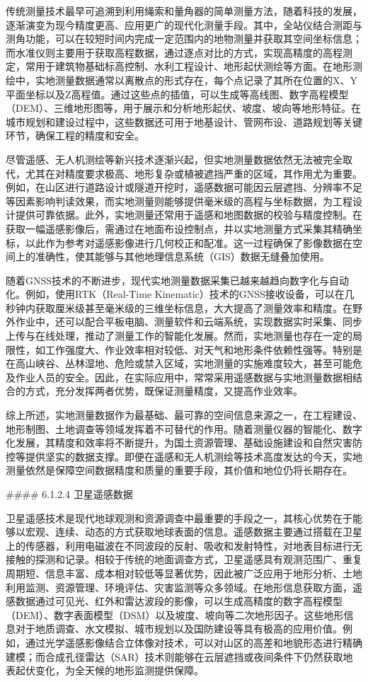 传统测量技术最早可追溯到利用绳索和量角器的简单测量方法，随着科技的发展，逐渐演变为现今精度更高、应用更广的现代化测量手段。其中，全站仪结合测距与测角功能，可以在较短时间内完成一定范围内的地物测量并获取其空间坐标信息；而水准仪则主要用于获取高程数据，通过逐点对比的方式，实现高精度的高程测定，常用于建筑物基础标高控制、水利工程设计、地形起伏测绘等方面。在地形测绘中，实地测量数据通常以离散点的形式存在，每个点记录了其所在位置的X、Y平面坐标以及Z高程值。通过这些点的插值，可以生成等高线图、数字高程模型（DEM）、三维地形图等，用于展示和分析地形起伏、坡度、坡向等地形特征。在城市规划和建设过程中，这些数据还可用于地基设计、管网布设、道路规划等关键环节，确保工程的精度和安全。

尽管遥感、无人机测绘等新兴技术逐渐兴起，但实地测量数据依然无法被完全取代，尤其在对精度要求极高、地形复杂或植被遮挡严重的区域，其作用尤为重要。例如，在山区进行道路设计或隧道开挖时，遥感数据可能因云层遮挡、分辨率不足等因素影响判读效果，而实地测量则能够提供毫米级的高程与坐标数据，为工程设计提供可靠依据。此外，实地测量还常用于遥感和地图数据的校验与精度控制。在获取一幅遥感影像后，需通过在地面布设控制点，并以实地测量方式采集其精确坐标，以此作为参考对遥感影像进行几何校正和配准。这一过程确保了影像数据在空间上的准确性，使其能够与其他地理信息系统（GIS）数据无缝叠加使用。

随着GNSS技术的不断进步，现代实地测量数据采集已越来越趋向数字化与自动化。例如，使用RTK（Real-Time Kinematic）技术的GNSS接收设备，可以在几秒钟内获取厘米级甚至毫米级的三维坐标信息，大大提高了测量效率和精度。在野外作业中，还可以配合平板电脑、测量软件和云端系统，实现数据实时采集、同步上传与在线处理，推动了测量工作的智能化发展。然而，实地测量也存在一定的局限性，如工作强度大、作业效率相对较低、对天气和地形条件依赖性强等。特别是在高山峡谷、丛林湿地、危险或禁入区域，实地测量的实施难度较大，甚至可能危及作业人员的安全。因此，在实际应用中，常常采用遥感数据与实地测量数据相结合的方式，充分发挥两者优势，既保证测量精度，又提高作业效率。

综上所述，实地测量数据作为最基础、最可靠的空间信息来源之一，在工程建设、地形制图、土地调查等领域发挥着不可替代的作用。随着测量仪器的智能化、数字化发展，其精度和效率将不断提升，为国土资源管理、基础设施建设和自然灾害防控等提供坚实的数据支撑。即便在遥感和无人机测绘等技术高度发达的今天，实地测量依然是保障空间数据精度和质量的重要手段，其价值和地位仍将长期存在。

\#\#\#\# 6.1.2.4 卫星遥感数据

卫星遥感技术是现代地球观测和资源调查中最重要的手段之一，其核心优势在于能够以宏观、连续、动态的方式获取地球表面的信息。遥感数据主要通过搭载在卫星上的传感器，利用电磁波在不同波段的反射、吸收和发射特性，对地表目标进行无接触的探测和记录。相较于传统的地面调查方式，卫星遥感具有观测范围广、重复周期短、信息丰富、成本相对较低等显著优势，因此被广泛应用于地形分析、土地利用监测、资源管理、环境评估、灾害监测等众多领域。在地形信息获取方面，遥感数据通过可见光、红外和雷达波段的影像，可以生成高精度的数字高程模型（DEM）、数字表面模型（DSM）以及坡度、坡向等二次地形因子。这些地形信息对于地质调查、水文模拟、城市规划以及国防建设等具有极高的应用价值。例如，通过光学遥感影像结合立体像对技术，可以对山区的高差和地貌形态进行精确建模；而合成孔径雷达（SAR）技术则能够在云层遮挡或夜间条件下仍然获取地表起伏变化，为全天候的地形监测提供保障。

